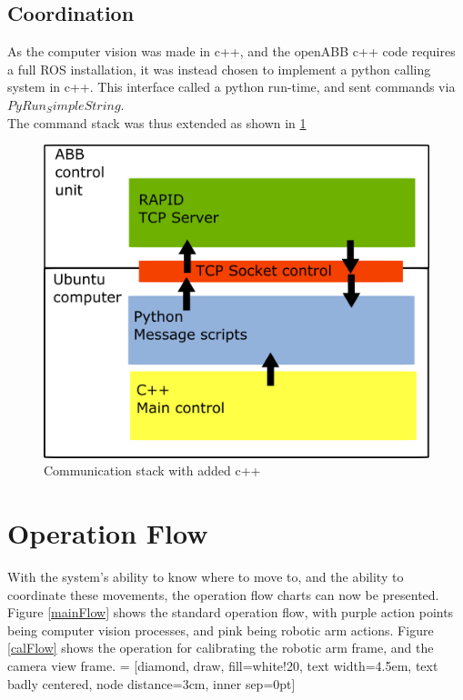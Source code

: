 \documentclass[11pt,a4paper]{report}
\begin{document}
\section{Coordination}
As the computer vision was made in c++, and the openABB c++ code requires a full ROS installation, it was instead chosen to implement a python calling system in c++. This interface called a python run-time, and sent commands via $PyRun_SimpleString$.\\
The command stack was thus extended as shown in \cref{fig:commstack2}
\begin{figure}[h]
\centering
\includegraphics[width=0.7\linewidth]{commstack2}
\caption{Communication stack with added c++}
\label{fig:commstack2}
\end{figure}
 
\chapter{Operation Flow}
With the system's ability to know where to move to, and the ability to coordinate these movements, the operation flow charts can now be presented. Figure \ref{mainFlow} shows the standard operation flow, with purple action points being computer vision processes, and pink being robotic arm actions. Figure \ref{calFlow} shows the operation for calibrating the robotic arm frame, and the camera view frame. 
 = [diamond, draw, fill=white!20, 
text width=4.5em, text badly centered, node distance=3cm, inner sep=0pt]
\end{document}

